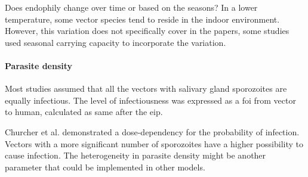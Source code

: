 \documentclass[a4paper, 12pt, twoside]{report}
\begin{document}
Does endophily change over time or based on the seasons?
In a lower temperature,  some vector species tend to reside in the indoor environment.
However, this variation does not specifically cover in the papers, some studies used seasonal carrying capacity to incorporate the variation.

\paragraph{Parasite density}%
\label{par:parasite_density}
Most studies assumed that all the vectors with salivary gland sporozoites are equally infectious.
The level of infectiousness was expressed as a \gls{foi} from vector to human, calculated as same after the \gls{eip}.

Churcher et al.\cite{Churcher2017a} demonstrated a dose-dependency for the probability of infection.
Vectors with a more significant number of sporozoites have a higher possibility to cause infection.
The heterogeneity in parasite density might be another parameter that could be implemented in other models.
\end{document}
